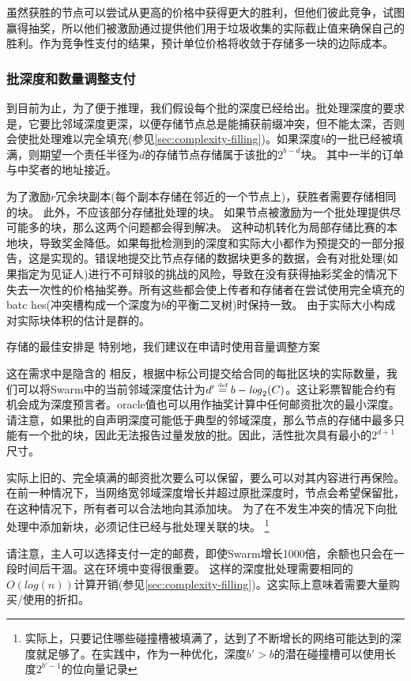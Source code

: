 虽然获胜的节点可以尝试从更高的价格中获得更大的胜利，但他们彼此竞争，试图赢得抽奖，所以他们被激励通过提供他们用于垃圾收集的实际截止值来确保自己的胜利。作为竞争性支付的结果，预计单位价格将收敛于存储多一块的边际成本。




\subsubsection{批深度和数量调整支付}

到目前为止，为了便于推理，我们假设每个批的深度已经给出。批处理深度的要求是，它要比邻域深度更深，以便存储节点总是能捕获前缀冲突，但不能太深，否则会使批处理难以完全填充(参见\ref{sec:complexity-filling})。如果深度$b$的一批已经被填满，则期望一个责任半径为$d$的存储节点存储属于该批的$2^{b-d}$块。
其中一半的订单与中奖者的地址接近。

为了激励$r$冗余块副本(每个副本存储在邻近的一个节点上)，获胜者需要存储相同的块。
此外，不应该部分存储批处理的块。
如果节点被激励为一个批处理提供尽可能多的块，那么这两个问题都会得到解决。
这种动机转化为局部存储比赛的本地块，导致奖金降低。如果每批检测到的深度和实际大小都作为预提交的一部分报告，这是实现的。错误地提交比节点存储的数据块更多的数据，会有对批处理(如果指定为见证人)进行不可辩驳的挑战的风险，导致在没有获得抽彩奖金的情况下失去一次性的价格抽奖券。所有这些都会使上传者和存储者在尝试使用完全填充的batc hes(冲突槽构成一个深度为$b$的平衡二叉树)时保持一致。
由于实际大小构成对实际块体积的估计是群的。

存储的最佳安排是
特别地，我们建议在申请时使用音量调整方案

这在需求中是隐含的
相反，根据中标公司提交给合同的每批区块的实际数量，我们可以将Swarm中的当前邻域深度估计为$d'\overset{\textrm{\tiny def}}{=} b - \mathit{log}_2(C)$。这让彩票智能合约有机会成为深度预言者。oracle值也可以用作抽奖计算中任何邮资批次的最小深度。请注意，如果批的自声明深度可能低于典型的邻域深度，那么节点的存储中最多只能有一个批的块，因此无法报告过量发放的批。因此，活性批次具有最小的$2^{d+1}$尺寸。


实际上旧的、完全填满的邮资批次要么可以保留，要么可以对其内容进行再保险。在前一种情况下，当网络宽邻域深度增长并超过原批深度时，节点会希望保留批，在这种情况下，所有者可以合法地向其添加块。
为了在不发生冲突的情况下向批处理中添加新块，必须记住已经与批处理关联的块。%
%
\footnote{实际上，只要记住哪些碰撞槽被填满了，达到了不断增长的网络可能达到的深度就足够了。在实践中，作为一种优化，深度$b' >b$的潜在碰撞槽可以使用长度$2^{b'-1}$的位向量记录}
%

请注意，主人可以选择支付一定的邮费，即使Swarm增长1000倍，余额也只会在一段时间后干涸。这在环境中变得很重要。
这样的深度批处理需要相同的$O(\mathit{log}(n))$计算开销(参见\ref{sec:complexity-filling})。这实际上意味着需要大量购买/使用的折扣。





